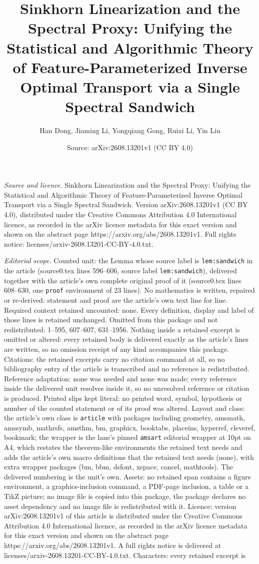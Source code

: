 \documentclass[10pt,a4paper]{amsart}
\title[Sinkhorn Linearization and the Spectral Proxy: Unifying the ]{Sinkhorn Linearization and the Spectral Proxy: Unifying the Statistical and Algorithmic Theory of Feature-Parameterized Inverse Optimal Transport via a Single Spectral Sandwich}
\author{Han Dong, Jiaming Li, Yongqiang Gong, Ruixi Li, Yin Liu}
\date{Source: arXiv:2608.13201v1 (CC BY 4.0)}
\begin{document}
\maketitle

\noindent\emph{Source and licence.} Sinkhorn Linearization and the Spectral Proxy: Unifying the Statistical and Algorithmic Theory of Feature-Parameterized Inverse Optimal Transport via a Single Spectral Sandwich. Version arXiv:2608.13201v1 (CC BY 4.0), distributed under the Creative Commons Attribution 4.0 International licence, as recorded in the arXiv licence metadata for this exact version and shown on the abstract page https://arxiv.org/abs/2608.13201v1. Full rights notice: licenses/arxiv-2608.13201-CC-BY-4.0.txt.\par\smallskip

\noindent\textit{Editorial scope.} Counted unit: the Lemma whose source label is \texttt{lem:sandwich} in the article (source0.tex lines 596--606, source label \texttt{lem:sandwich}), delivered together with the article's own complete original proof of it (source0.tex lines 608--630, one \texttt{proof} environment of 23 lines). No mathematics is written, repaired or re-derived: statement and proof are the article's own text line for line. Required context retained uncounted: none. Every definition, display and label of those lines is retained unchanged. Omitted from this package and not redistributed: 1--595, 607--607, 631--1956. Nothing inside a retained excerpt is omitted or altered: every retained body is delivered exactly as the article's lines are written, so no omission receipt of any kind accompanies this package. Citations: the retained excerpts carry no citation command at all, so no bibliography entry of the article is transcribed and no reference is redistributed. Reference adaptation: none was needed and none was made; every reference inside the delivered unit resolves inside it, so no unresolved reference or citation is produced. Printed slips kept literal: no printed word, symbol, hypothesis or number of the counted statement or of its proof was altered. Layout and class: the article's own class is \texttt{article} with packages including geometry, amsmath, amssymb, mathrsfs, amsthm, bm, graphicx, booktabs, placeins, hyperref, cleveref, bookmark; the wrapper is the lane's pinned \texttt{amsart} editorial wrapper at 10pt on A4, which restates the theorem-like environments the retained text needs and adds the article's own macro definitions that the retained text needs (none), with extra wrapper packages (bm, bbm, dsfont, xspace, cancel, mathtools). The delivered numbering is the unit's own. Assets: no retained span contains a figure environment, a graphics-inclusion command, a PDF-page inclusion, a table or a TikZ picture; no image file is copied into this package, the package declares no asset dependency and no image file is redistributed with it. Licence: version arXiv:2608.13201v1 of this article is distributed under the Creative Commons Attribution 4.0 International licence, as recorded in the arXiv licence metadata for this exact version and shown on the abstract page https://arxiv.org/abs/2608.13201v1. A full rights notice is delivered at licenses/arxiv-2608.13201-CC-BY-4.0.txt. Characters: every retained excerpt is 
\end{document}
